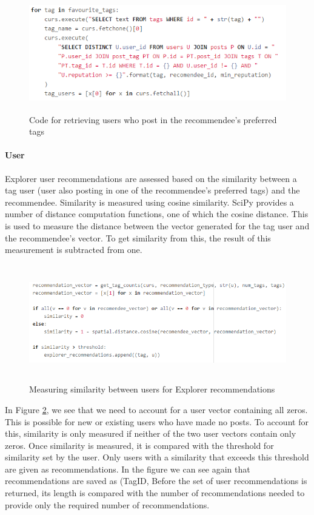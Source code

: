 \begin{figure}[H]
\centering
\includegraphics[height=2in]{Images/Implementation/ExplorerFavouriteTags}
\caption{Code for retrieving users who post in the recommendee's preferred tags}
\label{fig:ExplorerFavouriteTags}
\end{figure}

\paragraph{User} Explorer user recommendations are assessed based on the similarity between a tag user (user also posting in one of the recommendee's preferred tags) and the recommendee. Similarity is measured using cosine similarity. SciPy provides a number of distance computation functions, one of which the cosine distance. This is used to measure the distance between the vector generated for the tag user and the recommendee's vector. To get similarity from this, the result of this measurement is subtracted from one.

\begin{figure}[H]
\centering
\includegraphics[height=2in]{Images/Implementation/ExplorerSimilarity}
\caption{Measuring similarity between users for Explorer recommendations}
\label{fig:ExplorerSimilarity}
\end{figure}

\noindent In Figure \ref{fig:ExplorerSimilarity}, we see that we need to account for a user vector containing all zeros. This is possible for new or existing users who have made no posts. To account for this, similarity is only measured if neither of the two user vectors contain only zeros. Once similarity is measured, it is compared with the threshold for similarity set by the user. Only users with a similarity that exceeds this threshold are given as recommendations. In the figure we can see again that recommendations are saved as (TagID, Before the set of user recommendations is returned, its length is compared with the number of recommendations needed to provide only the required number of recommendations. 

